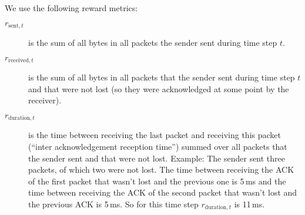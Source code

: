 \documentclass[sigconf]{acmart}
\begin{document}
We use the following reward metrics: 
\begin{description}
\item[$\textit{r}_{\text{sent},t}$] is the sum of all bytes in all packets the sender sent during time step $t$.
\item[$\textit{r}_{\text{received},t}$] is the sum of all bytes in all packets that the sender sent during time step $t$ and that were not lost (so they were acknowledged at some point by the receiver).
\item[$\textit{r}_{\text{duration},t}$] is the time between receiving the last packet and receiving this packet (``inter acknowledgement reception time'') summed over all packets that the sender sent and that were not lost. Example: The sender sent three packets, of which two were not lost. The time between receiving the ACK of the first packet that wasn't lost and the previous one is 5\,ms and the time between receiving the ACK of the second packet that wasn't lost and the previous ACK is 5\,ms. So for this time step $\textit{r}_{\text{duration},t}$ is 11\,ms.
\end{description}

\end{document}
